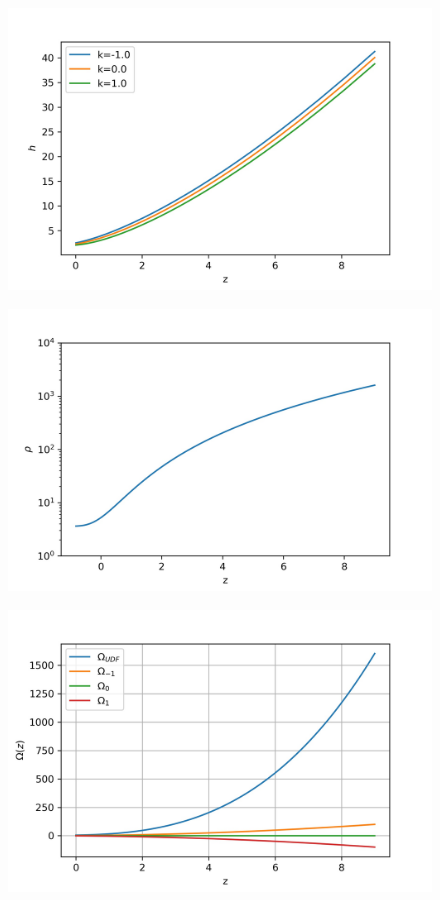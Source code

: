 \documentclass[a4paper, 11pt]{FSKH_623_Report}
\numberwithin{equation}{section}
\begin{document}
\begin{figure}[H]
\centering
\includegraphics[scale=1]{Figures/UDF_H.jpg}
\caption{}
\end{figure}

\begin{figure}[H]
\centering
\includegraphics[scale=1]{Figures/UDF_rho.jpg}
\caption{}
\end{figure}

\begin{figure}[H]
\centering
\includegraphics[scale=1]{Figures/UDF_Om.jpg}
\caption{}
\end{figure}
\end{document}
